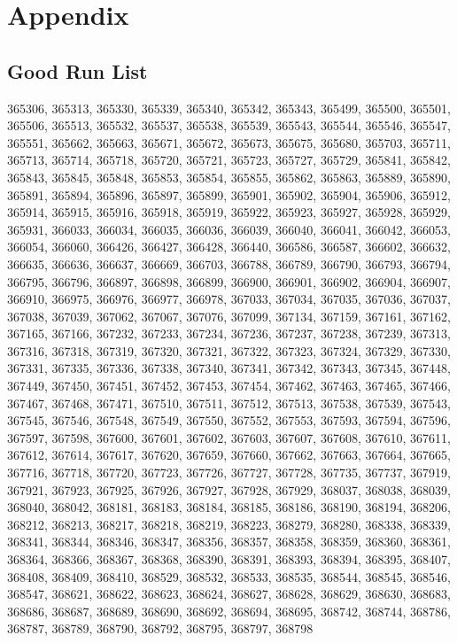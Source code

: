 \documentclass[12pt]{article}
\begin{document}
\section{Appendix}

\subsection{Good Run List}

365306, 365313, 365330, 365339, 365340, 365342, 365343, 365499, 365500, 365501, 365506,
365513, 365532, 365537, 365538, 365539, 365543, 365544, 365546, 365547, 365551, 365662,
365663, 365671, 365672, 365673, 365675, 365680, 365703, 365711, 365713, 365714, 365718,
365720, 365721, 365723, 365727, 365729, 365841, 365842, 365843, 365845, 365848, 365853,
365854, 365855, 365862, 365863, 365889, 365890, 365891, 365894, 365896, 365897, 365899,
365901, 365902, 365904, 365906, 365912, 365914, 365915, 365916, 365918, 365919, 365922,
365923, 365927, 365928, 365929, 365931, 366033, 366034, 366035, 366036, 366039, 366040,
366041, 366042, 366053, 366054, 366060, 366426, 366427, 366428, 366440, 366586, 366587,
366602, 366632, 366635, 366636, 366637, 366669, 366703, 366788, 366789, 366790, 366793,
366794, 366795, 366796, 366897, 366898, 366899, 366900, 366901, 366902, 366904, 366907,
366910, 366975, 366976, 366977, 366978, 367033, 367034, 367035, 367036, 367037, 367038,
367039, 367062, 367067, 367076, 367099, 367134, 367159, 367161, 367162, 367165, 367166,
367232, 367233, 367234, 367236, 367237, 367238, 367239, 367313, 367316, 367318, 367319,
367320, 367321, 367322, 367323, 367324, 367329, 367330, 367331, 367335, 367336, 367338,
367340, 367341, 367342, 367343, 367345, 367448, 367449, 367450, 367451, 367452, 367453,
367454, 367462, 367463, 367465, 367466, 367467, 367468, 367471, 367510, 367511, 367512,
367513, 367538, 367539, 367543, 367545, 367546, 367548, 367549, 367550, 367552, 367553,
367593, 367594, 367596, 367597, 367598, 367600, 367601, 367602, 367603, 367607, 367608,
367610, 367611, 367612, 367614, 367617, 367620, 367659, 367660, 367662, 367663, 367664,
367665, 367716, 367718, 367720, 367723, 367726, 367727, 367728, 367735, 367737, 367919,
367921, 367923, 367925, 367926, 367927, 367928, 367929, 368037, 368038, 368039, 368040,
368042, 368181, 368183, 368184, 368185, 368186, 368190, 368194, 368206, 368212, 368213,
368217, 368218, 368219, 368223, 368279, 368280, 368338, 368339, 368341, 368344, 368346,
368347, 368356, 368357, 368358, 368359, 368360, 368361, 368364, 368366, 368367, 368368,
368390, 368391, 368393, 368394, 368395, 368407, 368408, 368409, 368410, 368529, 368532,
368533, 368535, 368544, 368545, 368546, 368547, 368621, 368622, 368623, 368624, 368627,
368628, 368629, 368630, 368683, 368686, 368687, 368689, 368690, 368692, 368694, 368695,
368742, 368744, 368786, 368787, 368789, 368790, 368792, 368795, 368797, 368798
\end{document}
